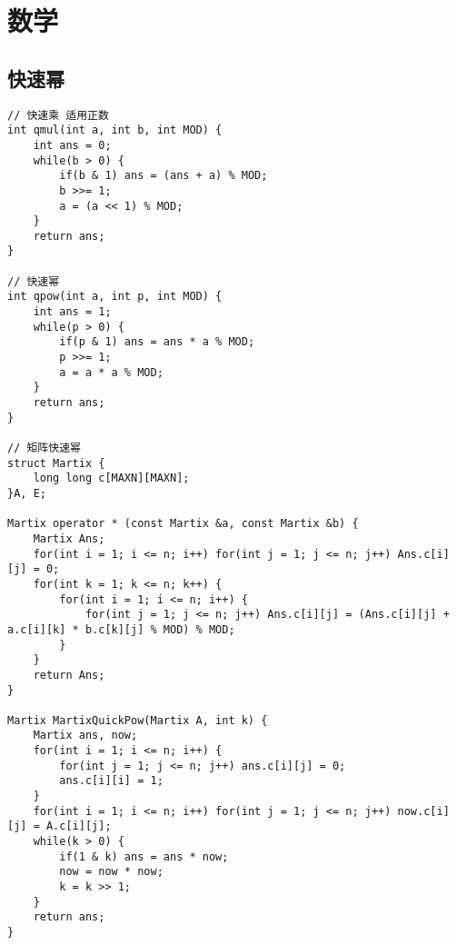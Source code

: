 \section{数学}
\subsection{快速幂}
\begin{lstlisting}
// 快速乘 适用正数 
int qmul(int a, int b, int MOD) {
	int ans = 0;
	while(b > 0) {
		if(b & 1) ans = (ans + a) % MOD;
		b >>= 1;
		a = (a << 1) % MOD;
	}
	return ans;
}

// 快速幂 
int qpow(int a, int p, int MOD) {
	int ans = 1;
	while(p > 0) {
		if(p & 1) ans = ans * a % MOD;
		p >>= 1;
		a = a * a % MOD;
	}
	return ans;
}

// 矩阵快速幂 
struct Martix {
	long long c[MAXN][MAXN];
}A, E;

Martix operator * (const Martix &a, const Martix &b) {
	Martix Ans;
	for(int i = 1; i <= n; i++) for(int j = 1; j <= n; j++) Ans.c[i][j] = 0;
	for(int k = 1; k <= n; k++) {
		for(int i = 1; i <= n; i++) {
			for(int j = 1; j <= n; j++) Ans.c[i][j] = (Ans.c[i][j] + a.c[i][k] * b.c[k][j] % MOD) % MOD;
		}
	}
	return Ans;
}

Martix MartixQuickPow(Martix A, int k) {
	Martix ans, now;
	for(int i = 1; i <= n; i++) {
		for(int j = 1; j <= n; j++) ans.c[i][j] = 0;
		ans.c[i][i] = 1;
	}
	for(int i = 1; i <= n; i++) for(int j = 1; j <= n; j++) now.c[i][j] = A.c[i][j];
	while(k > 0) {
		if(1 & k) ans = ans * now;
		now = now * now; 
		k = k >> 1;
	}
	return ans;
}
\end{lstlisting}

